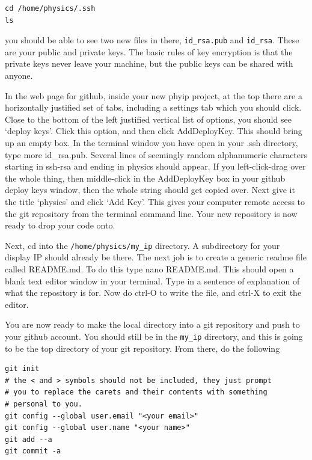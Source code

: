\documentclass[../physical_computing.tex]{subfiles}
\begin{document}
\begin{verbatim}
cd /home/physics/.ssh
ls
\end{verbatim}

you should be able to see two new files in there, \texttt{id\_rsa.pub} and
\texttt{id\_rsa}. These are your public and private keys. The basic rules of key encryption is that the private keys never leave your machine, but the public keys can be shared with anyone. 

In the web page for github, inside your new phyip project, at the top there are a horizontally justified set of tabs, including a settings tab which you should click. Close to the bottom of the left justified vertical list of options, you should see `deploy keys'. Click this option, and then click AddDeployKey. This should bring up an empty box. In the terminal window you have open in your .ssh directory, type more id\_rsa.pub. Several lines of seemingly random alphanumeric characters starting in ssh-rsa and ending in physics should appear. If you left-click-drag over the whole thing, then middle-click in the AddDeployKey box in your github deploy keys window, then the whole string should get copied over. Next give it the title `physics' and click `Add Key'. This gives your computer remote access to the git repository from the terminal command line. Your new repository is now ready to drop your code onto.

Next, cd into the \texttt{/home/physics/my\_ip} directory. A subdirectory for your display IP should already be there. The next job is to create a generic readme file called README.md. To do this type nano README.md. This should open a blank text editor window in your terminal. Type in a sentence of explanation of what the repository is for. Now do ctrl-O to write the file, and ctrl-X to exit the editor. 

You are now ready to make the local directory into a git repository and push to your github account. You should still be in the \texttt{my\_ip} directory, and this is going to be the top directory of your git repository. From there, do the following

\begin{verbatim}
git init
# the < and > symbols should not be included, they just prompt
# you to replace the carets and their contents with something
# personal to you.
git config --global user.email "<your email>"
git config --global user.name "<your name>"
git add --a
git commit -a
\end{verbatim}
\end{document}
